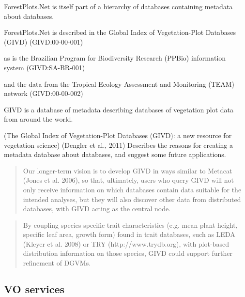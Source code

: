 \documentclass{article}
\begin{document}
ForestPlots.Net is itself part of a hierarchy of databases containing metadata
about databases.

ForestPlots.Net is described in the
Global Index of Vegetation-Plot Databases (GIVD)
(GIVD:00-00-001)

as is the Brazilian Program for Biodiversity Research (PPBio) information system
(GIVD:SA-BR-001)

and the data from the 
Tropical Ecology Assessment and Monitoring (TEAM)
network
(GIVD:00-00-002)

GIVD is a database of metadata describing databases of vegetation plot data
from around the world.

(The Global Index of Vegetation-Plot Databases (GIVD): a new resource for vegetation science)
(Dengler et al., 2011)
Describes the reasons for creating a metadata database about databases, and
suggest some future applications.

\begin{quote}
Our longer-term vision is to develop GIVD in ways similar to Metacat (Jones et
al. 2006), so that, ultimately, users who query GIVD will not only receive
information on which databases contain data suitable for the intended analyses,
but they will also discover other data from distributed databases, with GIVD
acting as the central node.
\end{quote}

\begin{quote}
By coupling species
specific trait characteristics (e.g. mean plant height, specific leaf area,
growth form) found in trait databases, such
as LEDA (Kleyer et al. 2008) or TRY (http://www.trydb.org),
with plot-based distribution information on those
species, GIVD could support further refinement of DGVMs.
\end{quote}













\subsection{VO services}
\end{document}
